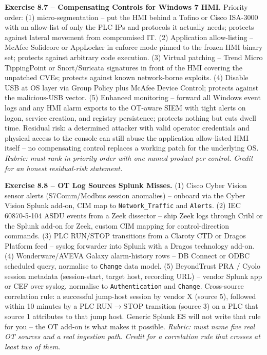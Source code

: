 \documentclass[11pt,a4paper]{article}
\begin{document}
\begin{solutionbox}
\textbf{Exercise 8.7 -- Compensating Controls for Windows 7 HMI.}
Priority order: (1) micro-segmentation -- put the HMI behind a Tofino or Cisco ISA-3000 with an allow-list of only the PLC IPs and protocols it actually needs; protects against lateral movement from compromised IT. (2) Application allow-listing -- McAfee Solidcore or AppLocker in enforce mode pinned to the frozen HMI binary set; protects against arbitrary code execution. (3) Virtual patching -- Trend Micro TippingPoint or Snort/Suricata signatures in front of the HMI covering the unpatched CVEs; protects against known network-borne exploits. (4) Disable USB at OS layer via Group Policy plus McAfee Device Control; protects against the malicious-USB vector. (5) Enhanced monitoring -- forward all Windows event logs and any HMI alarm exports to the OT-aware SIEM with tight alerts on logon, service creation, and registry persistence; protects nothing but cuts dwell time. Residual risk: a determined attacker with valid operator credentials and physical access to the console can still abuse the application allow-listed HMI itself -- no compensating control replaces a working patch for the underlying OS.
\textit{Rubric: must rank in priority order with one named product per control. Credit for an honest residual-risk statement.}
\end{solutionbox}

\begin{solutionbox}
\textbf{Exercise 8.8 -- OT Log Sources Splunk Misses.}
(1) Cisco Cyber Vision sensor alerts (S7Comm/Modbus session anomalies) -- onboard via the Cyber Vision Splunk add-on, CIM map to \texttt{Network\_Traffic} and \texttt{Alerts}. (2) IEC 60870-5-104 ASDU events from a Zeek dissector -- ship Zeek logs through Cribl or the Splunk add-on for Zeek, custom CIM mapping for control-direction commands. (3) PLC RUN/STOP transitions from a Claroty CTD or Dragos Platform feed -- syslog forwarder into Splunk with a Dragos technology add-on. (4) Wonderware/AVEVA Galaxy alarm-history rows -- DB Connect or ODBC scheduled query, normalise to \texttt{Change} data model. (5) BeyondTrust PRA / Cyolo session metadata (session-start, target host, recording URL) -- vendor Splunk app or CEF over syslog, normalise to \texttt{Authentication} and \texttt{Change}. Cross-source correlation rule: a successful jump-host session by vendor X (source 5), followed within 10 minutes by a PLC RUN$\to$STOP transition (source 3) on a PLC that source 1 attributes to that jump host. Generic Splunk ES will not write that rule for you -- the OT add-on is what makes it possible.
\textit{Rubric: must name five real OT sources and a real ingestion path. Credit for a correlation rule that crosses at least two of them.}
\end{solutionbox}
\end{document}
